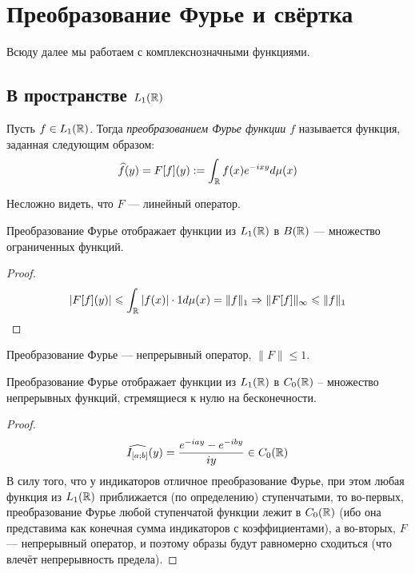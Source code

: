 \section{Преобразование Фурье и свёртка}

\begin{note}
	Всюду далее мы работаем с комплекснозначными функциями.
\end{note}

\subsection{В пространстве $L_1(\mathbb{R})$}

\begin{definition}
	Пусть $f \in L_1(\mathbb{R})$. Тогда \textit{преобразованием Фурье функции $f$} называется функция, заданная следующим образом:
	\[
		\widehat{f}(y) = F[f](y) := \int_{\mathbb{R}} f(x)e^{-ixy}d\mu(x)
	\]
\end{definition}

\begin{note}
	Несложно видеть, что $F$ --- линейный оператор.
\end{note}

\begin{proposition}
	Преобразование Фурье отображает функции из $L_1(\mathbb{R})$ в $B(\mathbb{R})$ --- множество ограниченных функций.
\end{proposition}

\begin{proof}
	\[
		\left|F[f](y)\right| \leqslant \int_{\mathbb{R}} |f(x)| \cdot 1 d\mu(x) = \|f\|_{1} \Rightarrow \|F[f]\|_\infty \leqslant \|f\|_1
	\]
\end{proof}

\begin{corollary}
	Преобразование Фурье --- непрерывный оператор, $\|F\| \le 1$.
\end{corollary}

\begin{proposition}
	Преобразование Фурье отображает функции из $L_1(\mathbb{R})$ в $C_0(\mathbb{R})$ -- множество непрерывных функций, стремящиеся к нулю на бесконечности.
\end{proposition}

\begin{proof}
	\[
		\widehat{I_{[a; b]}}(y) = \frac{e^{-iay} - e^{-iby}}{iy} \in C_0(\mathbb{R})
	\]
	В силу того, что у индикаторов отличное преобразование Фурье, при этом любая функция из $L_1(\mathbb{R})$ приближается (по определению) ступенчатыми, то во-первых, преобразование Фурье любой ступенчатой функции лежит в $C_0(\mathbb{R})$ (ибо она представима как конечная сумма индикаторов с коэффициентами), а во-вторых, $F$ --- непрерывный оператор, и поэтому образы будут равномерно сходиться (что влечёт непрерывность предела).
\end{proof}

